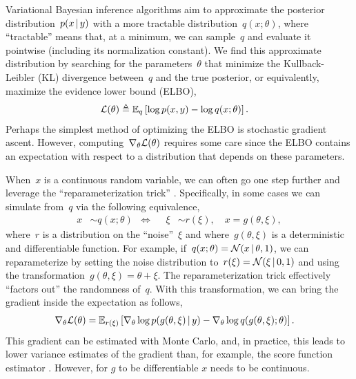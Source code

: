 Variational Bayesian inference algorithms aim to approximate the
posterior distribution~$p(x \, | \, y)$ with a more tractable
distribution~$q(x; \theta)$, where ``tractable'' means that, at a
minimum, we can sample~$q$ and evaluate it pointwise (including
its normalization constant).  We find this approximate distribution
by searching for the parameters~$\theta$ that minimize the Kullback-Leibler (KL)
divergence between~$q$ and the true posterior, or equivalently,
maximize the evidence lower bound (ELBO),
\begin{align}
  \mathcal{L}(\theta) &\triangleq \mathbb{E}_q \left[ \log p(x, y) - \log q(x; \theta) \right].
\end{align}
Perhaps the simplest method of optimizing the ELBO is stochastic
gradient ascent. 
However, computing~$\nabla_\theta \mathcal{L}(\theta)$ requires some care
since the ELBO contains an expectation with respect to a distribution
that depends on these parameters.

When~$x$ is a continuous random variable, we can often go one step
further and leverage the ``reparameterization trick''
\citep{Salimans2013, Kingma2014}.  Specifically, in some cases we can
simulate from~$q$ via the following equivalence,
\begin{align}
  \label{eq:reparam}
  x &\sim q(x; \theta)
      & \iff & &  
  \xi &\sim r(\xi), \quad x = g(\theta, \xi),
\end{align}
where~$r$ is a distribution on the ``noise''~$\xi$ and
where~$g(\theta, \xi)$ is a deterministic and differentiable
function. For example,
if~${q(x; \theta) = \mathcal{N}(x \, | \, \theta, 1)}$, we can
reparameterize by setting the noise distribution
to~${r(\xi) = \mathcal{N}(\xi \, | \, 0, 1)}$ and using the
transformation~${g(\theta, \xi) = \theta + \xi}$.  The
reparameterization trick effectively ``factors out'' the randomness
of~$q$. With this transformation, we can bring the gradient inside the
expectation as follows,
\begin{align}
  \nabla_\theta \mathcal{L}(\theta) 
  &= \mathbb{E}_{r(\xi)} \left[ \nabla_\theta \log p(g(\theta, \xi) \, | \, y)
    - \nabla_\theta  \log q(g(\theta, \xi); \theta) \right].
\end{align}
This gradient can be estimated with Monte Carlo, and, in practice,
this leads to lower variance estimates of the gradient than, for
example, the score function estimator \citep{Williams1992, Glynn1990}.
However, for $g$ to be differentiable $x$ needs to be continuous.

